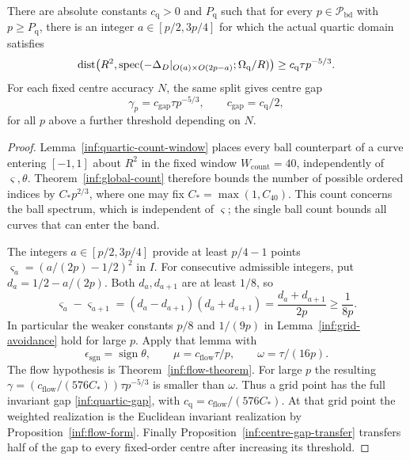 \begin{theorem}\label{inf:integer-gap}
There are absolute constants $c_{\mathrm q}>0$ and $P_{\mathrm q}$
such that for every $p\in\mathcal P_{\mathrm{bd}}$ with $p\ge P_{\mathrm q}$,
there is an integer $a\in[p/2,3p/4]$ for which the actual quartic
domain satisfies
\begin{equation}\label{inf:quartic-gap}
 \operatorname{dist}\bigl(R^2,\operatorname{spec}(-\Delta_D|_{O(a)\times O(2p-a)};
                               \Omega_{\mathrm q}/R)\bigr)
 \ge c_{\mathrm q}\tau p^{-5/3}.
\end{equation}
For each fixed centre accuracy $N$, the same split gives centre gap
\begin{equation}\label{inf:centre-gap}
 \gamma_p=c_{\mathrm{gap}}\tau p^{-5/3},\qquad
 c_{\mathrm{gap}}=c_{\mathrm q}/2,
\end{equation}
for all $p$ above a further threshold depending on $N$.
\end{theorem}
\begin{proof}
Lemma~\ref{inf:quartic-count-window} places every ball counterpart
of a curve entering $[-1,1]$ about $R^2$ in the fixed window
$W_{\mathrm{count}}=40$, independently of $\varsigma,\theta$.
Theorem~\ref{inf:global-count} therefore bounds the number of
possible ordered indices by $C_*p^{2/3}$, where one may fix
$C_*=\max(1,C_{40})$.
This count concerns the ball spectrum, which is independent of
$\varsigma$; the single ball count bounds all curves that can enter
the band.

The integers $a\in[p/2,3p/4]$ provide at least $p/4-1$ points
$\varsigma_a=(a/(2p)-1/2)^2$ in $I$. For consecutive admissible integers, put
$d_a=1/2-a/(2p)$. Both $d_a,d_{a+1}$ are at least $1/8$, so
\[
 \varsigma_a-\varsigma_{a+1}
 =(d_a-d_{a+1})(d_a+d_{a+1})
 =\frac{d_a+d_{a+1}}{2p}\ge\frac1{8p}.
\] In particular the weaker constants
$p/8$ and $1/(9p)$ in Lemma~\ref{inf:grid-avoidance} hold for
large $p$. Apply that lemma with
\[
 \epsilon_{\mathrm{sgn}}=\operatorname{sign}\theta,\qquad
 \mu=c_{\mathrm{flow}}\tau/p,\qquad
 \omega=\tau/(16p).
\]
The flow hypothesis is Theorem~\ref{inf:flow-theorem}.
For large $p$ the resulting
$\gamma=(c_{\mathrm{flow}}/(576C_*))\tau p^{-5/3}$ is smaller
than $\omega$. Thus a grid point has the full invariant gap
\eqref{inf:quartic-gap}, with
$c_{\mathrm q}=c_{\mathrm{flow}}/(576C_*)$.
At that grid point the weighted realization is the Euclidean
invariant realization by Proposition~\ref{inf:flow-form}.
Finally Proposition~\ref{inf:centre-gap-transfer} transfers half of
the gap to every fixed-order centre after increasing its threshold.
\end{proof}
